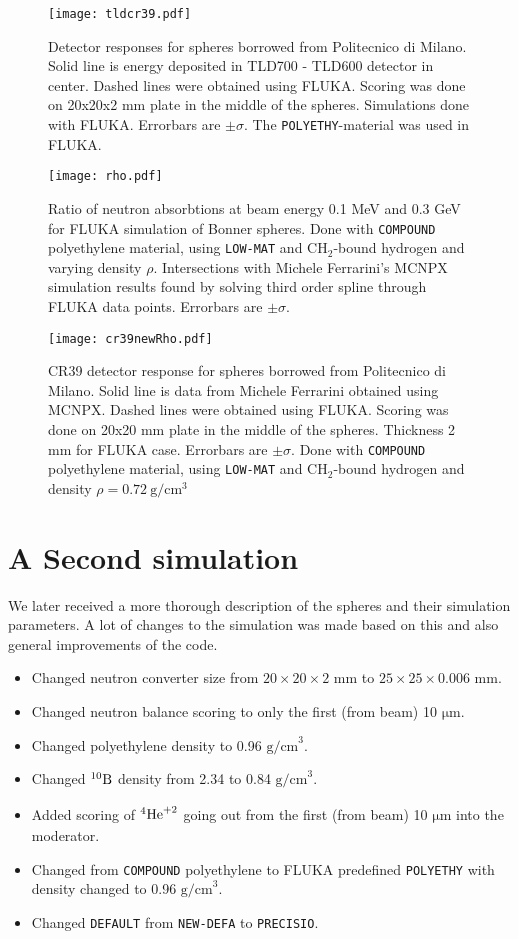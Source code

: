 \documentclass[a4paper,10pt]{article}
\newcommand{\nucl}[3]{
\ensuremath{
\phantom{\ensuremath{^{#1}_{#2}}}
\llap{\ensuremath{^{#1}}}
\llap{\ensuremath{_{\rule{0pt}{.75em}#2}}}
\mbox{#3}
}
}
\begin{document}
\begin{figure}
\centering
\texttt{[image: tldcr39.pdf]}
\caption
{Detector responses for spheres borrowed from Politecnico di Milano. Solid line is energy deposited in TLD700 - TLD600 detector in center. Dashed lines were obtained using FLUKA. Scoring was done on 20x20x2 mm plate in the middle of the spheres. Simulations done with FLUKA. Errorbars are $\pm\sigma$. The \texttt{POLYETHY}-material was used in FLUKA.}\label{2}
\end{figure}

\begin{figure}
\centering
\texttt{[image: rho.pdf]}
\caption
{Ratio of neutron absorbtions at beam energy 0.1 MeV and 0.3 GeV for FLUKA simulation of Bonner spheres. Done with \texttt{COMPOUND} polyethylene material, using \texttt{LOW-MAT} and $\mathrm{CH}_2$-bound hydrogen and varying density $\rho$. Intersections with Michele Ferrarini's MCNPX simulation results found by solving third order spline through FLUKA data points. Errorbars are $\pm\sigma$. }\label{rho}
\end{figure}

\begin{figure}
\centering
\texttt{[image: cr39newRho.pdf]}
\caption
{CR39 detector response for spheres borrowed from Politecnico di Milano. Solid line is data from Michele Ferrarini obtained using MCNPX. Dashed lines were obtained using FLUKA. Scoring was done on 20x20 mm plate in the middle of the spheres. Thickness 2 mm for FLUKA case. Errorbars are $\pm\sigma$. Done with \texttt{COMPOUND} polyethylene material, using \texttt{LOW-MAT} and $\mathrm{CH}_2$-bound hydrogen and density $\rho=0.72\ \mathrm{g}/\mathrm{cm}^3$}\label{3}
\end{figure}
\section{A Second simulation}
 We later received a more thorough description of the spheres and their simulation parameters. A lot of changes to the simulation was made based on this and also general improvements of the code.
\begin{itemize}
 \item Changed neutron converter size from $20\times20\times2$ mm to $25\times25\times0.006$ mm.
 \item Changed neutron balance scoring to only the first (from beam) 10 $\mathrm{\mu m}$.
 \item Changed polyethylene density to 0.96 $\mathrm{g/cm}^3$.
 \item Changed $\nucl{10}{}{B}$ density from 2.34 to 0.84 $\mathrm{g/cm}^3$.
 \item Added scoring of $\nucl{4}{}{He}^{+2}$ going out from the first (from beam) 10 $\mathrm{\mu m}$ into the moderator.
 \item Changed from \verb!COMPOUND! polyethylene to FLUKA predefined \verb!POLYETHY! with density changed to 0.96 $\mathrm{g/cm}^3$.
 \item Changed \verb!DEFAULT! from \verb!NEW-DEFA! to \verb!PRECISIO!.
\end{itemize}
\end{document}
